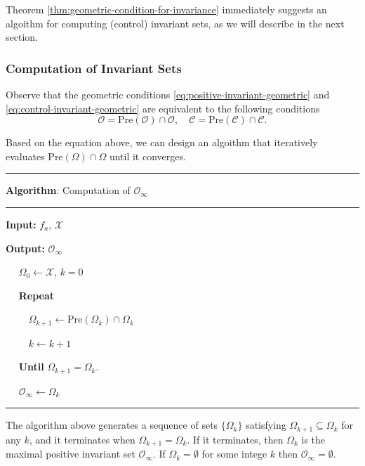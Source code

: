 \documentclass[
]{book}
\theoremstyle{definition}
\theoremstyle{definition}
\theoremstyle{definition}
\theoremstyle{definition}
\theoremstyle{remark}
\begin{document}
Theorem \ref{thm:geometric-condition-for-invariance} immediately suggests an algoithm for computing (control) invariant sets, as we will describe in the next section.

\hypertarget{mpc-compute-control-invariant-set}{%
\subsubsection{Computation of Invariant Sets}\label{mpc-compute-control-invariant-set}}

Observe that the geometric conditions \eqref{eq:positive-invariant-geometric} and \eqref{eq:control-invariant-geometric} are equivalent to the following conditions
\[
\mathcal{O} = \text{Pre}(\mathcal{O}) \cap \mathcal{O}, \quad \mathcal{C} = \text{Pre}(\mathcal{C}) \cap \mathcal{C}.
\]

Based on the equation above, we can design an algoithm that iteratively evaluates \(\text{Pre}(\mathcal{\Omega}) \cap \mathcal{\Omega}\) until it converges.

\begin{center}\rule{0.5\linewidth}{0.5pt}\end{center}

\textbf{Algorithm}: Computation of \(\mathcal{O}_{\infty}\)

\begin{center}\rule{0.5\linewidth}{0.5pt}\end{center}

\textbf{Input:} \(f_a\), \(\mathcal{X}\)

\textbf{Output:} \(\mathcal{O}_{\infty}\)

~~ \(\Omega_0 \leftarrow \mathcal{X}\), \(k=0\)

~~ \textbf{Repeat}

~~~~ \(\Omega_{k+1} \leftarrow \text{Pre}(\Omega_k) \cap \Omega_k\)

~~~~ \(k \leftarrow k+1\)

~~ \textbf{Until} \(\Omega_{k+1} = \Omega_k\).

~~ \(\mathcal{O}_{\infty} \leftarrow \Omega_k\)

\begin{center}\rule{0.5\linewidth}{0.5pt}\end{center}

The algorithm above generates a sequence of sets \(\{ \Omega_k \}\) satisfying \(\Omega_{k+1} \subseteq \Omega_k\) for any \(k\), and it terminates when \(\Omega_{k+1} = \Omega_k\). If it terminates, then \(\Omega_k\) is the maximal positive invariant set \(\mathcal{O}_{\infty}\). If \(\Omega_k = \emptyset\) for some intege \(k\) then \(\mathcal{O}_{\infty} = \emptyset\).
\end{document}
